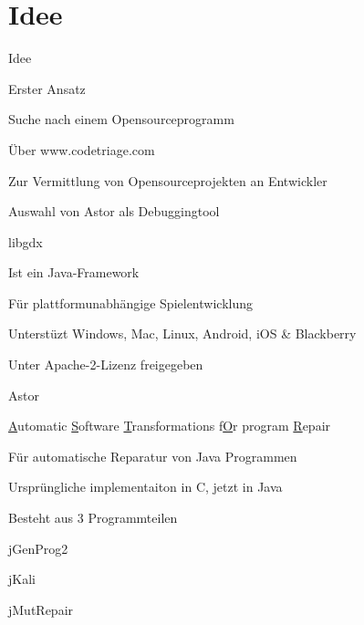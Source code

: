 \section{Idee}
%
\begin{frame}{}
\begin{center}
	\huge{Idee}
\end{center}
\end{frame}
%
\begin{frame}{Erster Ansatz}
	\begin{itemizes}{1em}
		\item Suche nach einem Opensourceprogramm
		\item Über www.codetriage.com
		\begin{itemizes}{0em}
			\item Zur Vermittlung von Opensourceprojekten an Entwickler
		\end{itemizes}
		\item Auswahl von Astor als Debuggingtool
	\end{itemizes}
\end{frame}
%
\begin{frame}{libgdx}
	\begin{itemizes}{1em}
		\item Ist ein Java-Framework
		\item Für plattformunabhängige Spielentwicklung
		\item Unterstüzt Windows, Mac, Linux, Android, iOS \& Blackberry
		\item Unter Apache-2-Lizenz freigegeben
	\end{itemizes}
\end{frame}
%
\begin{frame}{Astor}
	\begin{itemizes}{1em}
		\item \underline{A}utomatic \underline{S}oftware \underline{T}ransformations f\underline{O}r program \underline{R}epair
		\item Für automatische Reparatur von Java Programmen
		\item Ursprüngliche implementaiton in C, jetzt in Java
		\item Besteht aus 3 Programmteilen
		\begin{itemizes}{0em}
			\item jGenProg2
			\item jKali
			\item jMutRepair
		\end{itemizes}
	\end{itemizes}
\end{frame}
